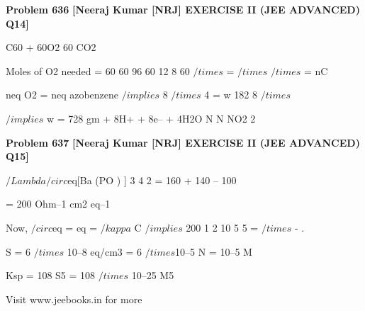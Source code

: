 \begin{problembox}
\textbf{Problem 636} \hfill \textbf{[Neeraj Kumar [NRJ] EXERCISE II (JEE ADVANCED) Q14]}
\label{q:ext-nrj_all_questions-636}

C60 + 60O2 
 60 CO2
 
 Moles of O2 needed = 60
60
96
60
12
8
60
$/times$
=
$/times$
$/times$
=
nC
 
 
 neq O2 = neq azobenzene $/implies$ 8 $/times$ 4 = w
182
8
$/times$
 
 
 $/implies$ w = 728 gm
+ 8H+ + 8e--
+ 4H2O
N
N
NO2
2
\end{problembox}

\begin{problembox}
\textbf{Problem 637} \hfill \textbf{[Neeraj Kumar [NRJ] EXERCISE II (JEE ADVANCED) Q15]}
\label{q:ext-nrj_all_questions-637}

$/Lambda$$/circ$eq[Ba (PO ) ]
3
4 2 = 160 + 140 -- 100 
 
                          = 200 Ohm--1 cm2 eq--1
 
 Now,  $/circ$eq =  eq = $/kappa$
C $/implies$ 200
1 2
10
5
5
=
$/times$
-
.
 
   S = 6 $/times$ 10--8 eq/cm3 = 6 $/times$10--5 N = 10--5 M
 
   Ksp = 108 S5 = 108 $/times$ 10--25 M5
 
 
Visit www.jeebooks.in for more
\end{problembox}